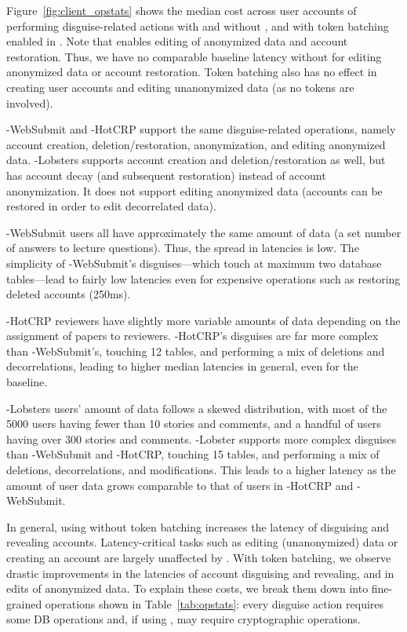 %
Figure~\ref{fig:client_opstats} shows the median cost across user accounts of performing disguise-related actions with and
without \sys, and with token batching enabled in \sys. 
Note that \sys enables editing of anonymized data and account restoration. Thus, we have no
comparable baseline latency without \sys for editing anonymized data or account restoration. 
Token batching also has no effect in creating user accounts and editing unanonymized data (as no
tokens are involved).

\sys-WebSubmit and \sys-HotCRP support the same disguise-related operations, namely
account creation, deletion/restoration, anonymization, and editing anonymized data.
\sys-Lobsters supports account creation and deletion/restoration as well, but has account decay (and
subsequent restoration) instead of account anonymization.  It does not support editing anonymized
data (accounts can be restored in order to edit decorrelated data).

\sys-WebSubmit users all have approximately the same amount of data (a set number of answers to
lecture questions). Thus, the spread in latencies is low. The simplicity of \sys-WebSubmit's
disguises---which touch at maximum two database tables---lead to fairly low latencies even for
expensive operations such as restoring deleted accounts (250ms).

\sys-HotCRP reviewers have slightly more variable amounts of data  depending on the
assignment of papers to reviewers. \sys-HotCRP's disguises are far more complex than
\sys-WebSubmit's, touching 12 tables, and performing a mix of deletions and
decorrelations, leading to higher median latencies in general, even for the baseline.

\sys-Lobsters users' amount of data follows a skewed distribution, with most of the 5000 users having fewer than
10 stories and comments, and a handful of users having over 300 stories and comments.
\sys-Lobster supports more complex disguises than 
\sys-WebSubmit and \sys-HotCRP, touching 15 tables, and performing a mix of deletions, 
decorrelations, and modifications. This leads to a higher latency as the amount of user data grows
comparable to that of users in \sys-HotCRP and \sys-WebSubmit.

In general, using \sys without token batching increases the latency of
disguising and revealing accounts. Latency-critical tasks such as editing (unanonymized) data or
creating an account are largely unaffected by \sys. With token batching, we observe drastic
improvements in the latencies of account disguising and revealing, and in edits of anonymized data.
%
To explain these costs, we break them down into fine-grained operations shown in
Table~\ref{tab:opstats}: every disguise action requires some DB operations and,
if using \sys, may require cryptographic operations.

